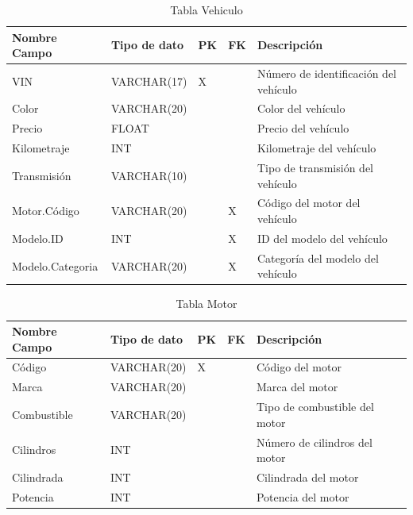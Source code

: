 \documentclass[12pt]{article}
\begin{document}
\begin{table}[htbp]
    \begin{center}
        \begin{tabular}{|p{3cm}|p{3cm}|p{1cm}|p{1cm}|p{6cm}|}
            \hline
            Nombre Campo & Tipo de dato & PK & FK & Descripción \\
            \hline
            VIN & VARCHAR(17) & X &  & Número de identificación del vehículo \\
            Color & VARCHAR(20) &  &  & Color del vehículo \\
            Precio & FLOAT &  &  & Precio del vehículo \\
            Kilometraje & INT &  &  & Kilometraje del vehículo \\
            Transmisión & VARCHAR(10) &  &  & Tipo de transmisión del vehículo \\
            Motor.Código & VARCHAR(20) &  & X & Código del motor del vehículo \\
            Modelo.ID & INT &  & X & ID del modelo del vehículo \\
            Modelo.Categoria & VARCHAR(20) &  & X & Categoría del modelo del vehículo \\
            \hline
            \end{tabular}
        \caption{Tabla Vehiculo}
            \end{center}
\end{table}


\begin{table}[htbp]
    \begin{center}
        \begin{tabular}{|p{3cm}|p{3cm}|p{1cm}|p{1cm}|p{6cm}|}
            \hline
            Nombre Campo & Tipo de dato & PK & FK & Descripción \\
            \hline
            Código & VARCHAR(20) & X &  & Código del motor \\
            Marca & VARCHAR(20) &  &  & Marca del motor \\
            Combustible & VARCHAR(20) &  &  & Tipo de combustible del motor \\
            Cilindros & INT &  &  & Número de cilindros del motor \\
            Cilindrada & INT &  &  & Cilindrada del motor \\
            Potencia & INT &  &  & Potencia del motor \\
            \hline
            \end{tabular}
        \caption{Tabla Motor}
            \end{center}
\end{table}
\end{document}
